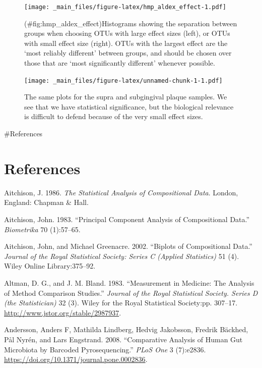 \documentclass[onecolumn]{book}
\theoremstyle{definition}
\theoremstyle{definition}
\theoremstyle{definition}
\theoremstyle{remark}
\begin{document}
\begin{figure}
\centering
\texttt{[image: \_main\_files/figure-latex/hmp\_aldex\_effect-1.pdf]}
\caption{(\#fig:hmp\_aldex\_effect)Histograms showing the separation
between groups when choosing OTUs with large effect sizes (left), or
OTUs with small effect size (right). OTUs with the largest effect are
the `most reliably different' between groups, and should be chosen over
those that are `most significantly different' whenever possible.}
\end{figure}

\newpage

\begin{figure}
\centering
\texttt{[image: \_main\_files/figure-latex/unnamed-chunk-1-1.pdf]}
\caption{\label{fig:unnamed-chunk-1}The same plots for the supra and
subgingival plaque samples. We see that we have statistical
significance, but the biological relevance is difficult to defend
because of the very small effect sizes.}
\end{figure}

\newpage

\#References

\hypertarget{references}{%
\chapter{References}\label{references}}

\hypertarget{refs}{}
\leavevmode\hypertarget{ref-Aitchison:1986}{}%
Aitchison, J. 1986. \emph{The Statistical Analysis of Compositional
Data}. London, England: Chapman \& Hall.

\leavevmode\hypertarget{ref-Ait1983}{}%
Aitchison, John. 1983. ``Principal Component Analysis of Compositional
Data.'' \emph{Biometrika} 70 (1):57--65.

\leavevmode\hypertarget{ref-aitchison2002biplots}{}%
Aitchison, John, and Michael Greenacre. 2002. ``Biplots of Compositional
Data.'' \emph{Journal of the Royal Statistical Society: Series C
(Applied Statistics)} 51 (4). Wiley Online Library:375--92.

\leavevmode\hypertarget{ref-altman:1983}{}%
Altman, D. G., and J. M. Bland. 1983. ``Measurement in Medicine: The
Analysis of Method Comparison Studies.'' \emph{Journal of the Royal
Statistical Society. Series D (the Statistician)} 32 (3). Wiley for the
Royal Statistical Society:pp. 307--17.
\url{http://www.jstor.org/stable/2987937}.

\leavevmode\hypertarget{ref-Andersson:2008}{}%
Andersson, Anders F, Mathilda Lindberg, Hedvig Jakobsson, Fredrik
Bäckhed, Pål Nyrén, and Lars Engstrand. 2008. ``Comparative Analysis of
Human Gut Microbiota by Barcoded Pyrosequencing.'' \emph{PLoS One} 3
(7):e2836. \url{https://doi.org/10.1371/journal.pone.0002836}.
\end{document}
